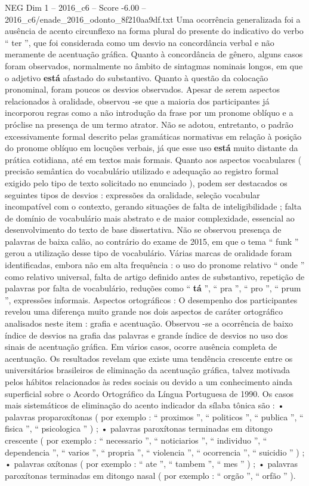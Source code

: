 \begin{textsample}{NEG Dim 1 – 2016\_c6 – Score -6.00 – 2016\_c6/enade\_2016\_odonto\_8f210aa9df.txt}
Uma ocorrência generalizada foi a ausência de acento circunflexo na forma plural do presente do indicativo do verbo “ ter ”, que foi considerada como um desvio na concordância verbal e não meramente de acentuação gráfica.
Quanto à concordância de gênero, alguns casos foram observados, normalmente no âmbito de sintagmas nominais longos, em que o adjetivo \textbf{está} afastado do substantivo.
Quanto à questão da colocação pronominal, foram poucos os desvios observados.
Apesar de serem aspectos relacionados à oralidade, observou -se que a maioria dos participantes já incorporou regras como a não introdução da frase por um pronome oblíquo e a próclise na presença de um termo atrator.
Não se adotou, entretanto, o padrão excessivamente formal descrito pelas gramáticas normativas em relação à posição do pronome oblíquo em locuções verbais, já que esse uso \textbf{está} muito distante da prática cotidiana, até em textos mais formais.
Quanto aos aspectos vocabulares ( precisão semântica do vocabulário utilizado e adequação ao registro formal exigido pelo tipo de texto solicitado no enunciado ), podem ser destacados os seguintes tipos de desvios : expressões da oralidade, seleção vocabular incompatível com o contexto, gerando situações de falta de inteligibilidade ; falta de domínio de vocabulário mais abstrato e de maior complexidade, essencial ao desenvolvimento do texto de base dissertativa.
Não se observou presença de palavras de baixa calão, ao contrário do exame de 2015, em que o tema “ funk ” gerou a utilização desse tipo de vocabulário.
Várias marcas de oralidade foram identificadas, embora não em alta frequência : o uso do pronome relativo “ onde ” como relativo universal, falta de artigo definido antes de substantivo, repetição de palavras por falta de vocabulário, reduções como “ \textbf{tá} ”, “ pra ”, “ pro ”, “ prum ”, expressões informais.
Aspectos ortográficos : O desempenho dos participantes revelou uma diferença muito grande nos dois aspectos de caráter ortográfico analisados neste item : grafia e acentuação.
Observou -se a ocorrência de baixo índice de desvios na grafia das palavras e grande índice de desvios no uso dos sinais de acentuação gráfica.
Em vários casos, ocorre ausência completa de acentuação.
Os resultados revelam que existe uma tendência crescente entre os universitários brasileiros de eliminação da acentuação gráfica, talvez motivada pelos hábitos relacionados às redes sociais ou devido a um conhecimento ainda superficial sobre o Acordo Ortográfico da Língua Portuguesa de 1990.
Os casos mais sistemáticos de eliminação do acento indicador da sílaba tônica são : • palavras proparoxítonas ( por exemplo : “ proximos ”, “ politicos ”, “ publica ”, “ fisica ”, “ psicologica ” ) ; • palavras paroxítonas terminadas em ditongo crescente ( por exemplo : “ necessario ”, “ noticiarios ”, “ individuo ”, “ dependencia ”, “ varios ”, “ propria ”, “ violencia ”, “ ocorrencia ”, “ suicidio ” ) ; • palavras oxítonas ( por exemplo : “ ate ”, “ tambem ”, “ mes ” ) ; • palavras paroxítonas terminadas em ditongo nasal ( por exemplo : “ orgão ”, “ orfão ” ).

\end{textsample}
